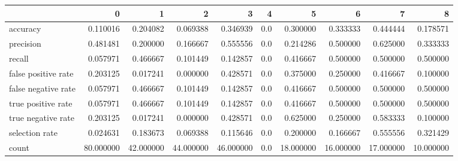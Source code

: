 \begin{tabular}{lrrrrrrrrr}
\toprule
{} &          0 &          1 &          2 &          3 &    4 &          5 &          6 &          7 &          8 \\
\midrule
accuracy            &   0.110016 &   0.204082 &   0.069388 &   0.346939 &  0.0 &   0.300000 &   0.333333 &   0.444444 &   0.178571 \\
precision           &   0.481481 &   0.200000 &   0.166667 &   0.555556 &  0.0 &   0.214286 &   0.500000 &   0.625000 &   0.333333 \\
recall              &   0.057971 &   0.466667 &   0.101449 &   0.142857 &  0.0 &   0.416667 &   0.500000 &   0.500000 &   0.500000 \\
false positive rate &   0.203125 &   0.017241 &   0.000000 &   0.428571 &  0.0 &   0.375000 &   0.250000 &   0.416667 &   0.100000 \\
false negative rate &   0.057971 &   0.466667 &   0.101449 &   0.142857 &  0.0 &   0.416667 &   0.500000 &   0.500000 &   0.500000 \\
true positive rate  &   0.057971 &   0.466667 &   0.101449 &   0.142857 &  0.0 &   0.416667 &   0.500000 &   0.500000 &   0.500000 \\
true negative rate  &   0.203125 &   0.017241 &   0.000000 &   0.428571 &  0.0 &   0.625000 &   0.250000 &   0.583333 &   0.100000 \\
selection rate      &   0.024631 &   0.183673 &   0.069388 &   0.115646 &  0.0 &   0.200000 &   0.166667 &   0.555556 &   0.321429 \\
count               &  80.000000 &  42.000000 &  44.000000 &  46.000000 &  0.0 &  18.000000 &  16.000000 &  17.000000 &  10.000000 \\
\bottomrule
\end{tabular}
